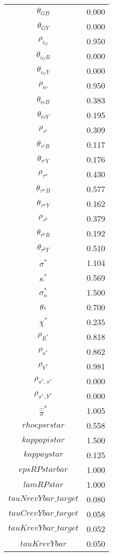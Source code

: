 \begin{center}
\begin{longtable}{cc}
$\theta_{GB}$ 	 & 	 0.000 \\
$\theta_{GY}$ 	 & 	 0.000 \\
$\rho_{i_G}$ 	 & 	 0.950 \\
$\theta_{i_GB}$ 	 & 	 0.000 \\
$\theta_{i_GY}$ 	 & 	 0.000 \\
$\rho_{tr}$ 	 & 	 0.950 \\
$\theta_{trB}$ 	 & 	 0.383 \\
$\theta_{trY}$ 	 & 	 0.195 \\
$\rho_{\tau^c}$ 	 & 	 0.309 \\
$\theta_{\tau^cB}$ 	 & 	 0.117 \\
$\theta_{\tau^cY}$ 	 & 	 0.176 \\
$\rho_{\tau^w}$ 	 & 	 0.430 \\
$\theta_{\tau^wB}$ 	 & 	 0.577 \\
$\theta_{\tau^wY}$ 	 & 	 0.162 \\
$\rho_{\tau^k}$ 	 & 	 0.379 \\
$\theta_{\tau^kB}$ 	 & 	 0.192 \\
$\theta_{\tau^kY}$ 	 & 	 0.510 \\
$\sigma^*$ 	 & 	 1.104 \\
$\kappa^*$ 	 & 	 0.569 \\
$\sigma^*_n$ 	 & 	 1.500 \\
$\theta_*$ 	 & 	 0.700 \\
$\chi^*$ 	 & 	 0.235 \\
${\rho_{R^*}}$ 	 & 	 0.818 \\
${\rho_{\pi^*}}$ 	 & 	 0.862 \\
${\rho_{Y^*}}$ 	 & 	 0.981 \\
${\rho_{\pi^*,\pi^*}}$ 	 & 	 0.000 \\
${\rho_{\pi^*,Y^*}}$ 	 & 	 0.000 \\
$\hat{\bar{\pi}}^*$ 	 & 	 1.005 \\
$rhoepsrstar$ 	 & 	 0.558 \\
$kappapistar$ 	 & 	 1.500 \\
$kappaystar$ 	 & 	 0.125 \\
$epsRPstarbar$ 	 & 	 1.000 \\
$lamRPstar$ 	 & 	 1.000 \\
$tauNrevYbar\_target$ 	 & 	 0.080 \\
$tauCrevYbar\_target$ 	 & 	 0.058 \\
$tauKrevYbar\_target$ 	 & 	 0.052 \\
$tauKrevYbar$ 	 & 	 0.050 \\

\end{longtable}
\end{center}
